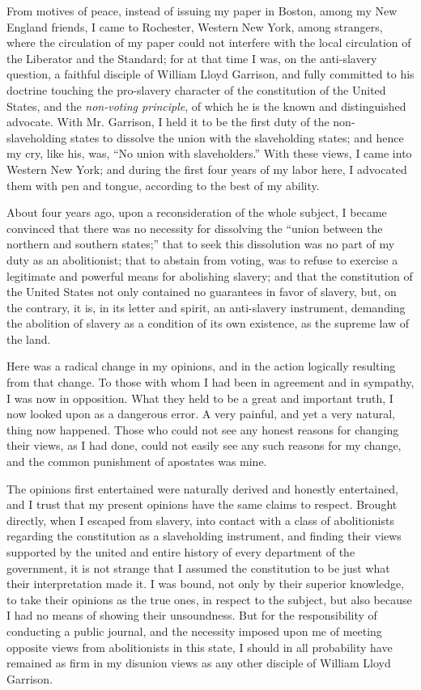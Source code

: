 From motives of peace, instead of issuing my paper in Boston, among my
New England friends, I came to Rochester, Western New York, among
strangers, where the circulation of my paper could not interfere with
the local circulation of the Liberator and the Standard; for at that
time I was, on the anti-slavery question, a faithful disciple of William
Lloyd Garrison, and fully committed to his doctrine touching the
pro-slavery character of the constitution of the United States, and the
\emph{non-voting principle}, of which he is the known and distinguished
advocate. With Mr. Garrison, I held it to be the first duty of the
non-slaveholding states to dissolve the union with the slaveholding
states; and hence my cry, like his, was, ``No union with slaveholders.''
With these views, I {}came into Western New York; and during the first
four years of my labor here, I advocated them with pen and tongue,
according to the best of my ability.

About four years ago, upon a reconsideration of the whole subject, I
became convinced that there was no necessity for dissolving the ``union
between the northern and southern states;'' that to seek this
dissolution was no part of my duty as an abolitionist; that to abstain
from voting, was to refuse to exercise a legitimate and powerful means
for abolishing slavery; and that the constitution of the United States
not only contained no guarantees in favor of slavery, but, on the
contrary, it is, in its letter and spirit, an anti-slavery instrument,
demanding the abolition of slavery as a condition of its own existence,
as the supreme law of the land.

Here was a radical change in my opinions, and in the action logically
resulting from that change. To those with whom I had been in agreement
and in sympathy, I was now in opposition. What they held to be a great
and important truth, I now looked upon as a dangerous error. A very
painful, and yet a very natural, thing now happened. Those who could not
see any honest reasons for changing their views, as I had done, could
not easily see any such reasons for my change, and the common punishment
of apostates was mine.

The opinions first entertained were naturally derived and honestly
entertained, and I trust that my present opinions have the same claims
to respect. Brought directly, when I escaped from slavery, into contact
with a class of abolitionists regarding the {}constitution as a
slaveholding instrument, and finding their views supported by the united
and entire history of every department of the government, it is not
strange that I assumed the constitution to be just what their
interpretation made it. I was bound, not only by their superior
knowledge, to take their opinions as the true ones, in respect to the
subject, but also because I had no means of showing their unsoundness.
But for the responsibility of conducting a public journal, and the
necessity imposed upon me of meeting opposite views from abolitionists
in this state, I should in all probability have remained as firm in my
disunion views as any other disciple of William Lloyd Garrison.

